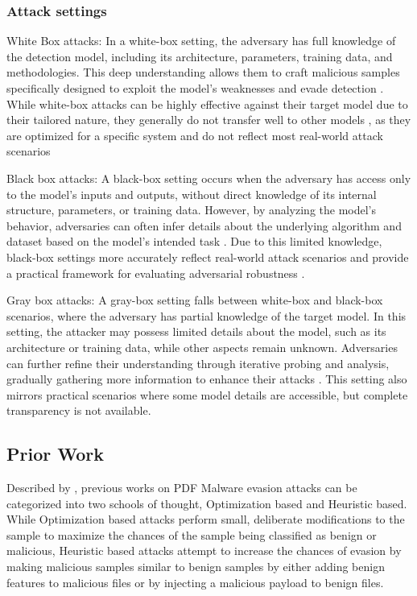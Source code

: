 \documentclass[10pt,twocolumn]{article}
\begin{document}
\subsubsection{Attack settings}
White Box attacks:
	In a white-box setting, the adversary has full knowledge of the detection model, including its architecture, parameters, training data, and methodologies. This deep understanding allows them to craft malicious samples specifically designed to exploit the model’s weaknesses and evade detection \cite{Kaushik2023}. While white-box attacks can be highly effective against their target model due to their tailored nature, they generally do not transfer well to other models \cite{Costa2023}, as they are optimized for a specific system and do not reflect most real-world attack scenarios

Black box attacks:
	A black-box setting occurs when the adversary has access only to the model's inputs and outputs, without direct knowledge of its internal structure, parameters, or training data. However, by analyzing the model’s behavior, adversaries can often infer details about the underlying algorithm and dataset based on the model’s intended task \cite{Wang2022}. Due to this limited knowledge, black-box settings more accurately reflect real-world attack scenarios and provide a practical framework for evaluating adversarial robustness \cite{Qi2022}.

Gray box attacks:
	A gray-box setting falls between white-box and black-box scenarios, where the adversary has partial knowledge of the target model. In this setting, the attacker may possess limited details about the model, such as its architecture or training data, while other aspects remain unknown. Adversaries can further refine their understanding through iterative probing and analysis, gradually gathering more information to enhance their attacks \cite{Alotaibi2023}. This setting also mirrors practical scenarios where some model details are accessible, but complete transparency is not available.


\subsection{Prior Work}

Described by \textcite{Maiorca2019}, previous works on PDF Malware evasion attacks can be categorized into two schools of thought, Optimization based and Heuristic based. While Optimization based attacks perform small, deliberate modifications to the sample to maximize the chances of the sample being classified as benign or malicious, Heuristic based attacks attempt to increase the chances of evasion by making malicious samples similar to benign samples by either adding benign features to malicious files or by injecting a malicious payload to benign files.
\end{document}
